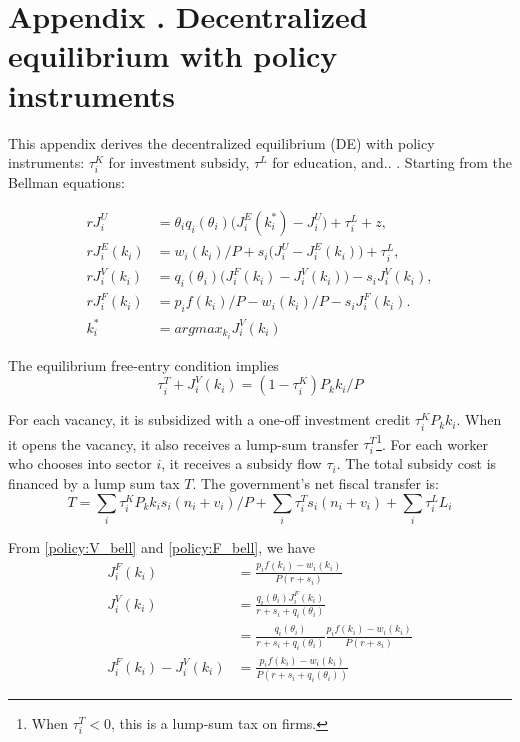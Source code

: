 \documentclass[12pt]{article} %
\newcommand{\appsection}[1]{%
  \refstepcounter{section}%
  \section*{Appendix \Alph{section}. #1}%
}
\theoremstyle{definition}
\begin{document}
\newpage
\appsection{Decentralized equilibrium with policy instruments}\label{appendix:DE_policy}


This appendix derives the decentralized equilibrium (DE) with policy instruments: $\tau_i^K$ for investment subsidy, $\tau^L$ for education, and..   . Starting from the Bellman equations:

\begin{align}
rJ_i^U &= \theta_i q_i(\theta_i)\big(J_i^E(k_i^*)-J_i^U\big)+ \tau_i^L+z, \label{policy:U_bell}\\
rJ_i^E(k_i) &= w_i(k_i)/P + s_i\big(J_i^U-J_i^E(k_i)\big) +\tau^L_i, \label{policy:E_bell} \\ 
rJ_i^V(k_i) &=  q_i(\theta_i)\big(J_i^F(k_i)-J_i^V(k_i)\big) - s_i J^V_i(k_i), \label{policy:V_bell}\\
rJ_i^F(k_i) &= p_i f(k_i)/P - w_i(k_i)/P - s_i J_i^F(k_i). 
\label{policy:F_bell} \\
k^*_i &= argmax_{k_i} {J^V_i(k_i)}  \label{policy:kstar}
\end{align}

The equilibrium free-entry condition implies 
\begin{equation}
 \tau^T_i +    J^V_i(k_i) =(1-\tau^K_i) P_kk_i/P
\end{equation}

For each vacancy, it is subsidized with a one-off investment credit $\tau^K_iP_kk_i$. When it opens the vacancy, it also receives a lump-sum transfer $\tau_i^T$\footnote{When $\tau_i^T<0$, this is a lump-sum tax on firms.}. For each worker who chooses into sector $i$, it receives a subsidy flow $\tau_i$. The total subsidy cost is financed by a lump sum tax $T$.
The government's net fiscal transfer is:
\begin{equation}
    T = \sum_i \tau^K_i P_kk_i s_i(n_i+v_i)/P + \sum_i\tau^T_is_i(n_i+v_i) + \sum_i\tau_i^LL_i
\end{equation}



From \eqref{policy:V_bell} and \eqref{policy:F_bell}, we have
\begin{align}
    J_i^F(k_i) &=   \frac{p_i f(k_i)-w_i(k_i)}{P(r+s_i)}\\
    \nonumber J_i^V(k_i) & =   \frac{q_i(\theta_i)J^F_i(k_i)}{r+s_i+q_i(\theta_i)}\\
    & = \frac{q_i(\theta_i)}{r+s_i+q_i(\theta_i)}\frac{p_i f(k_i)-w_i(k_i)}{P(r+s_i)}  \label{policy:JV_int1}\\
    J_i^F(k_i)-J_i^V(k_i) & = \frac{p_i f(k_i)-w_i(k_i)}{P(r+s_i+q_i(\theta_i))}
\end{align}
\end{document}
